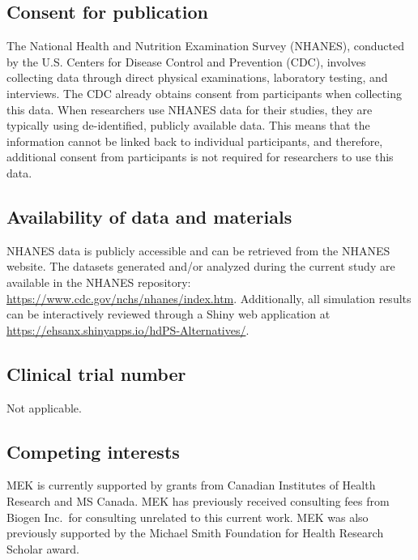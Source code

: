 \documentclass[sn-vancouver,Numbered,lineno,pdflatex]{sn-jnl}
\begin{document}
\subsection*{Consent for publication}\label{consent-for-publication}

The National Health and Nutrition Examination Survey (NHANES), conducted
by the U.S. Centers for Disease Control and Prevention (CDC), involves
collecting data through direct physical examinations, laboratory
testing, and interviews. The CDC already obtains consent from
participants when collecting this data. When researchers use NHANES data
for their studies, they are typically using de-identified, publicly
available data. This means that the information cannot be linked back to
individual participants, and therefore, additional consent from
participants is not required for researchers to use this data.

\subsection*{Availability of data and
materials}\label{availability-of-data-and-materials}

NHANES data is publicly accessible and can be retrieved from the NHANES
website. The datasets generated and/or analyzed during the current study
are available in the NHANES repository:
\url{https://www.cdc.gov/nchs/nhanes/index.htm}. Additionally, all
simulation results can be interactively reviewed through a Shiny web
application at \url{https://ehsanx.shinyapps.io/hdPS-Alternatives/}.

\subsection*{Clinical trial number}\label{clinical-trial-number}

Not applicable.

\subsection*{Competing interests}\label{competing-interests}

MEK is currently supported by grants from Canadian Institutes of Health
Research and MS Canada. MEK has previously received consulting fees from
Biogen Inc.~for consulting unrelated to this current work. MEK was also
previously supported by the Michael Smith Foundation for Health Research
Scholar award.
\end{document}
